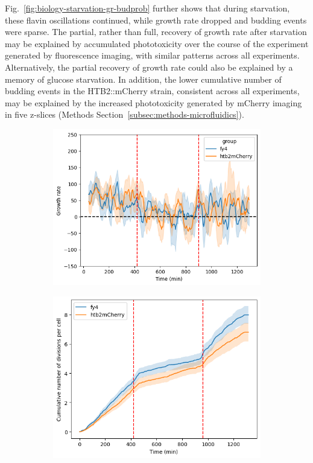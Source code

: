 Fig.\ \ref{fig:biology-starvation-gr-budprob} further shows that during starvation, these flavin oscillations continued, while growth rate dropped and budding events were sparse.
The partial, rather than full, recovery of growth rate after starvation may be explained by accumulated phototoxicity over the course of the experiment generated by fluorescence imaging, with similar patterns across all experiments.
Alternatively, the partial recovery of growth rate could also be explained by a memory of glucose starvation.
In addition, the lower cumulative number of budding events in the HTB2::mCherry strain, consistent across all experiments, may be explained by the increased phototoxicity generated by mCherry imaging in five z-slices (Methods Section~\ref{subsec:methods-microfluidics}).

\begin{figure}
  \centering
  \begin{subfigure}[htpb]{0.45\textwidth}
   \centering
   \includegraphics[width=\textwidth]{allstrains_19972_gr}
   \caption{
   }
   \label{fig:biology-starvation-gr}
  \end{subfigure}%
  \begin{subfigure}[htpb]{0.45\textwidth}
   \centering
   \includegraphics[width=\textwidth]{allstrains_19972_cumul}
   \caption{
   }
   \label{fig:biology-starvation-cumul}
  \end{subfigure}


\end{figure}
